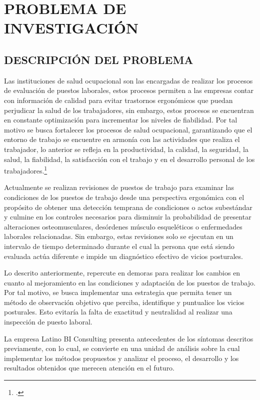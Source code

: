 \chapter{PROBLEMA DE INVESTIGACIÓN}

\section{DESCRIPCIÓN DEL PROBLEMA}
Las instituciones de salud ocupacional son las encargadas de realizar los procesos de evaluación de puestos laborales, estos procesos permiten a las empresas contar con información de calidad para evitar trastornos ergonómicos que puedan perjudicar la salud de los trabajadores, sin embargo, estos procesos se encuentran en constante optimización para incrementar los niveles de fiabilidad. Por tal motivo se busca fortalecer los procesos de salud ocupacional, garantizando que el entorno de trabajo se encuentre en armonía con las actividades que realiza el trabajador, lo anterior se refleja en la productividad, la calidad, la seguridad, la salud, la fiabilidad, la satisfacción con el trabajo y en el desarrollo personal de los trabajadores.\footcite[3]{MiguelAGonzalezPerez}

Actualmente se realizan revisiones de puestos de trabajo para examinar las condiciones de los puestos de trabajo desde una perspectiva ergonómica con el propósito de obtener una detección temprana de condiciones o actos subestándar y culmine en los controles necesarios para disminuir la probabilidad de presentar alteraciones osteomusculares, desórdenes músculo esqueléticos o enfermedades laborales relacionadas. Sin embargo, estas revisiones solo se ejecutan en un intervalo de tiempo determinado durante el cual la persona que está siendo evaluada actúa diferente e impide un diagnóstico efectivo de vicios posturales.

Lo descrito anteriormente, repercute en demoras para realizar los cambios en cuanto al mejoramiento en las condiciones y adaptación de los puestos de trabajo. Por tal motivo, se busca implementar una estrategia que permita tener un método de observación objetivo que perciba, identifique y puntualice los vicios posturales. Esto evitaría la falta de exactitud y neutralidad al realizar una inspección de puesto laboral.

La empresa Latino BI Consulting presenta antecedentes de los síntomas descritos previamente, con lo cual, se convierte en una unidad de análisis sobre la cual implementar los métodos propuestos y analizar el proceso, el desarrollo y los resultados obtenidos que merecen atención en el futuro.

